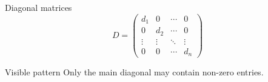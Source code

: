 \begin{frame}{Diagonal matrices}
  \[
  D=\begin{pmatrix}
  d_1&0&\cdots&0\\
  0&d_2&\cdots&0\\
  \vdots&\vdots&\ddots&\vdots\\
  0&0&\cdots&d_n
  \end{pmatrix}
  \]
  \begin{block}{Visible pattern}
    Only the main diagonal may contain non-zero entries.
  \end{block}
\end{frame}
